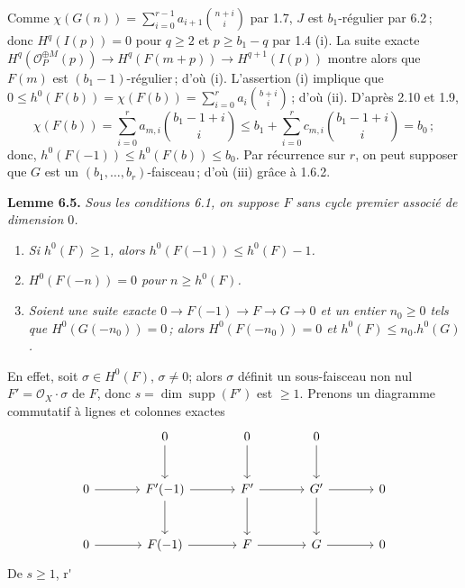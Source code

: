 Comme \(\chi(G(n))=\sum_{i=0}^{r-1} a_{i+1}\binom{n+i}{i}\) par 1.7, $J$ est $b_1$-r\'egulier par 6.2\,; donc \(H^q(I(p))=0\) pour $q\ge2$ et $p\ge b_1-q$ par 1.4 (i). La suite exacte \(H^q(\mathcal O_P^{\oplus M}(p))\longrightarrow H^q(F(m+p))\longrightarrow H^{q+1}(I(p))\) montre alors que $F(m)$ est $(b_1-1)$-r\'egulier\,; d'o\`u (i). L'assertion (i) implique que \(0\le h^0(F(b))=\chi(F(b))=\sum_{i=0}^{r}a_i\binom{b+i}{i}\)\,; d'o\`u (ii). D'apr\`es 2.10 et 1.9,
\[
   \chi(F(b))=\sum_{i=0}^{r} a_{m,i}\binom{b_1-1+i}{i}\le b_1+\sum_{i=0}^{r} c_{m,i}\binom{b_1-1+i}{i}=b_0\,;
\]
donc, $h^0(F(-1))\le h^0(F(b))\le b_0$. Par r\'ecurrence sur $r$, on peut supposer que $G$ est un $(b_1,\ldots,b_r)$-faisceau\,; d'o\`u (iii) gr\^ace \`a 1.6.2.

\textbf{Lemme 6.5.} \emph{Sous les conditions 6.1, on suppose $F$ sans cycle premier associ\'e de dimension $0$.}
\begin{enumerate}[label=(\roman*)]
\item \emph{Si $h^0(F)\ge1$, alors $h^0(F(-1))\le h^0(F)-1$.}
\item \emph{$H^0(F(-n))=0$ pour $n\ge h^0(F)$.}
\item \emph{Soient une suite exacte $0\to F(-1)\to F\to G\to0$ et un entier $n_0\ge0$ tels que $H^0(G(-n_0))=0$\,; alors $H^0(F(-n_0))=0$ et $h^0(F)\le n_0.h^0(G)$.}
\end{enumerate}
En effet, soit $\sigma\in H^0(F)$, $\sigma\ne0$; alors $\sigma$ d\'efinit un sous-faisceau non nul $F'=\mathcal O_X\cdot\sigma$ de $F$, donc $s=\dim\operatorname{supp}(F')$ est $\ge1$. Prenons un diagramme commutatif \`a lignes et colonnes exactes
\[
\begin{tikzcd}[column sep=large,row sep=large]
&0 \arrow[d]&0 \arrow[d]&0 \arrow[d]&\\
0 \arrow[r]&F'(-1) \arrow[r] \arrow[d]&F' \arrow[r] \arrow[d]&G' \arrow[r] \arrow[d]&0\\
0 \arrow[r]&F(-1) \arrow[r]&F \arrow[r]&G \arrow[r]&0
\end{tikzcd}
\]
De $s\ge1$, r\'

